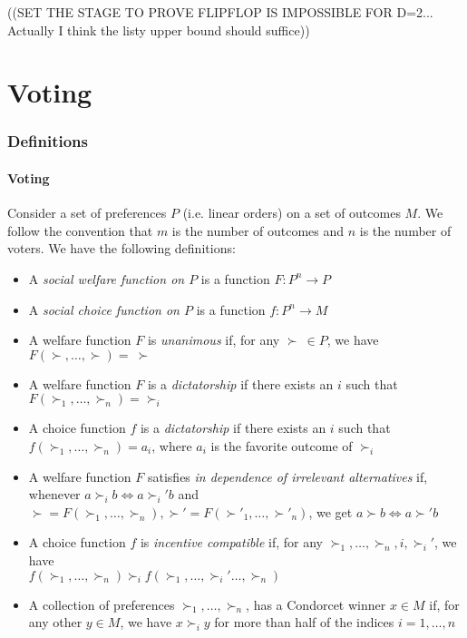 \documentclass[12pt]{article}
\newcommand{\1}[1]{\mathds{1}[{#1}]}
\begin{document}
  ((SET THE STAGE TO PROVE FLIPFLOP IS IMPOSSIBLE FOR D=2...
  Actually I think the listy upper bound should suffice))


\clearpage
\part{Voting}

\section{Definitions}
  \subsection{Voting}
    Consider a set of preferences $P$ (i.e. linear orders) on a
    set of outcomes $M$.
    We follow the convention that $m$ is the number of outcomes and $n$
    is the number of voters.
    We have the following definitions:
    \begin{itemize}
      \item A \emph{social welfare function on $P$}
        is a function $F : P^n \to P$
      \item A \emph{social choice function on $P$}
        is a function $f : P^n \to M$
      \item A welfare function $F$ is \emph{unanimous} if,
        for any $\succ\ \in P$, we have $F(\succ,\ldots,\succ) =\ \succ$
      \item A welfare function $F$ is a \emph{dictatorship} if
        there exists an $i$ such that $F(\succ_1,\ldots,\succ_n) = \succ_i$
      \item A choice function $f$ is a \emph{dictatorship} if
        there exists an $i$ such that $f(\succ_1,\ldots,\succ_n) = a_i$,
        where $a_i$ is the favorite outcome of $\succ_i$
      \item A welfare function $F$ satisfies \emph{in dependence of
        irrelevant alternatives} if, whenever $a\succ_i b \iff a\succ_i' b$
        and $\succ = F(\succ_1,\ldots,\succ_n),
        \succ' = F(\succ'_1,\ldots,\succ'_n)$,
        we get $a\succ b \iff a\succ' b$
      \item A choice function $f$ is \emph{incentive compatible} if,
        for any $\succ_1,\ldots,\succ_n, i, \succ_i'$, we have \\
        $f(\succ_1,\ldots,\succ_n) \succ_i f(\succ_1,\ldots,\succ_i'\ldots,\succ_n)$
      \item A collection of preferences $\succ_1,\ldots,\succ_n$,
        has a Condorcet winner $x \in M$ if, for any other $y\in M$,
        we have $x \succ_i y$ for more than half of the indices
        $i=1,\ldots,n$
    \end{itemize}
\end{document}
